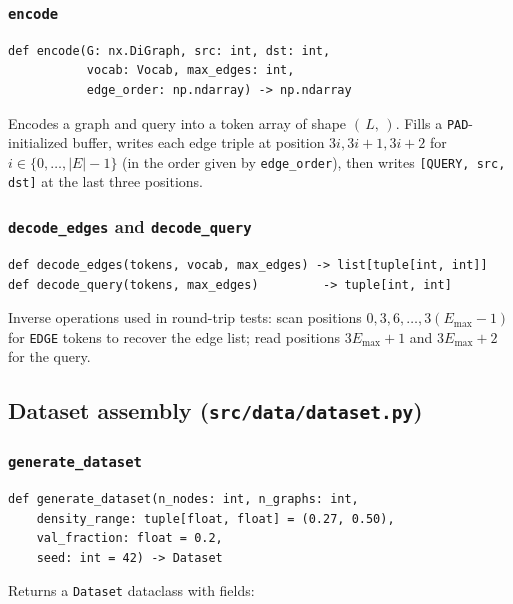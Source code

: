 \documentclass[11pt, a4paper]{article}
\begin{document}
\subsubsection{\texttt{encode}}

\begin{lstlisting}
def encode(G: nx.DiGraph, src: int, dst: int,
           vocab: Vocab, max_edges: int,
           edge_order: np.ndarray) -> np.ndarray
\end{lstlisting}

Encodes a graph and query into a token array of shape $(\,L,\,)$. Fills a
\texttt{PAD}-initialized buffer, writes each edge triple at position
$3i, 3i+1, 3i+2$ for $i \in \{0, \ldots, |E|-1\}$ (in the order given by
\texttt{edge\_order}), then writes \texttt{[QUERY, src, dst]} at the last
three positions.

\subsubsection{\texttt{decode\_edges} and \texttt{decode\_query}}

\begin{lstlisting}
def decode_edges(tokens, vocab, max_edges) -> list[tuple[int, int]]
def decode_query(tokens, max_edges)         -> tuple[int, int]
\end{lstlisting}

Inverse operations used in round-trip tests: scan positions
$0, 3, 6, \ldots, 3(E_{\max}-1)$ for \texttt{EDGE} tokens to recover the
edge list; read positions $3E_{\max}+1$ and $3E_{\max}+2$ for the query.

\subsection{Dataset assembly (\texttt{src/data/dataset.py})}

\subsubsection{\texttt{generate\_dataset}}

\begin{lstlisting}
def generate_dataset(n_nodes: int, n_graphs: int,
    density_range: tuple[float, float] = (0.27, 0.50),
    val_fraction: float = 0.2,
    seed: int = 42) -> Dataset
\end{lstlisting}

Returns a \texttt{Dataset} dataclass with fields:
\end{document}

